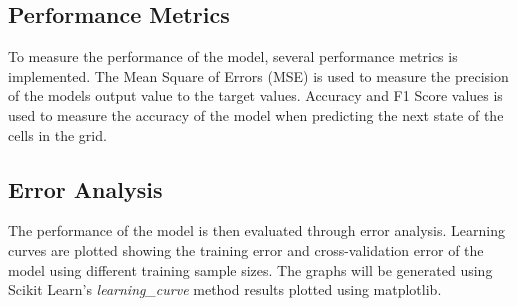 \subsection{Performance Metrics}
    To measure the performance of the model, several performance metrics is implemented. The Mean Square of Errors (MSE) is used to measure the precision of the models output value to the target values. Accuracy and F1 Score values is used to measure the accuracy of the model when predicting the next state of the cells in the grid.

\subsection{Error Analysis}
    The performance of the model is then evaluated through error analysis. Learning curves are plotted showing the training error and cross-validation error of the model using different training sample sizes. The graphs will be generated using Scikit Learn's \textit{learning\_curve} method results plotted using matplotlib.
